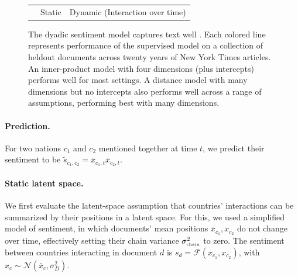 \begin{figure}
\begin{tabular}{m{2cm}cc}
  \\ & Static & Dynamic (Interaction over time) \\
\end{tabular}
  \label{fig:fr_supervised_performance}
   \caption{The dyadic sentiment model captures text well . Each
     colored line represents performance of the supervised model on a collection
     of heldout documents across twenty years of New York Times
     articles. An inner-product model with four dimensions (plus
     intercepts) performs well for most settings.  A distance model
     with many dimensions but no intercepts also performs well across
     a range of assumptions, performing best with many dimensions.}
\end{figure}

\paragraph{Prediction.}
For two nations $c_1$ and $c_2$ mentioned together at time $t$, we
predict their sentiment to be $\tilde s_{c_1, c_2} = \bar x_{c_1,t} \bar x_{c_2, t}$.

\paragraph{Static latent space.}
We first evaluate the latent-space assumption that countries'
interactions can be summarized by their positions in a latent space.
For this, we used a simplified model of sentiment, in which documents'
mean positions $\bar x_{c_1}, x_{c_2}$ do not change over time,
effectively setting their chain variance $\sigma_{\mbox{\tiny
    chain}}^2$ to zero.  The
sentiment between countries interacting in document $d$ is $s_d =
\mathcal{F}(x_{c_1}, x_{c_2})$, with $x_c \sim \mathcal{N}(\bar x_c,
\sigma_D^2)$.

